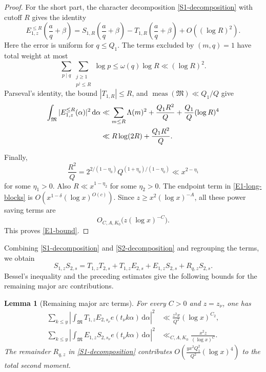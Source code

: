 \documentclass[12pt,reqno]{amsart}
\numberwithin{equation}{section}
\theoremstyle{plain}
\newtheorem{lemma}[theorem]{Lemma}
\theoremstyle{remark}
\newcommand{\dif}{\mathrm{d}}
\newcommand{\majorarc}{\mathfrak{M}}
\begin{document}
\begin{proof}
For the short part, the character decomposition
\eqref{S1-decomposition} with cutoff $R$ gives the identity
\begin{equation*}\label{E1-short-identity}
 E_{1,z}^{\leq R}\left(\frac aq+\beta\right)
 =S_{1,R}\left(\frac aq+\beta\right)
 -T_{1,R}\left(\frac aq+\beta\right)
  +O((\log R)^2).
\end{equation*}
Here the error is uniform for $q\leq Q_1$.
The terms excluded by $(m,q)=1$ have total weight at most
\[
 \sum_{p\mid q}\sum_{\substack{j\geq1\\p^j\leq R}}\log p
 \leq\omega(q)\log R\ll(\log R)^2.
\]
Parseval's identity, the bound $|T_{1,R}|\leq R$, and
$\operatorname{meas}(\majorarc)\ll Q_1/Q$ give
\begin{align*}
 \int_{\majorarc}|E_{1,z}^{\leq R}(\alpha)|^2\,\dif\alpha
 &\ll \sum_{m\leq R}\Lambda(m)^2
      +\frac{Q_1R^2}{Q}
      +\frac{Q_1}{Q}(\log R)^4\notag\\
 &\ll R\log(2R)+\frac{Q_1R^2}{Q}.
 \label{E1-short-blocks}
\end{align*}

Finally,
\[
 \frac{R^2}{Q}
 =2^{2/(1-\eta_0)}Q^{(1+\eta_0)/(1-\eta_0)}
 \ll x^{2-\eta_1}
\]
for some $\eta_1>0$.
Also $R\ll x^{1-\eta_2}$ for some $\eta_2>0$.
The endpoint term in \eqref{E1-long-blocks} is
$O(x^{1-\delta}(\log x)^{O(c)})$.
Since $z\geq x^2(\log x)^{-A}$, all these power saving terms are
\[
 O_{C,A,K_0}\bigl(z(\log x)^{-C}\bigr).
\]
This proves \eqref{E1-bound}.
\end{proof}

Combining \eqref{S1-decomposition} and \eqref{S2-decomposition}
and regrouping the terms, we obtain
\begin{equation}\label{recombined-major-decomposition}
 S_{1,z}S_{2,s}
 =T_{1,z}T_{2,s}+T_{1,z}E_{2,s}+E_{1,z}S_{2,s}
 +R_{q,z}S_{2,s}.
\end{equation}
Bessel's inequality and the preceding estimates give the following
bounds for the remaining major arc contributions.


\begin{lemma}[Remaining major arc terms]\label{lem:mixed-major}
For every $C>0$ and $z=z_\nu$, one has
\begin{align}
 \sum_{k\leq y}
 \left|
 \int_{\majorarc}T_{1,z}E_{2,s_\nu}
 e(t_\nu k\alpha)\,\dif\alpha
 \right|^2
 &\ll
 \frac{z^2x}{Q^2}(\log x)^{C_2},
\label{T1E2-bound}\\
 \sum_{k\leq y}
 \left|
 \int_{\majorarc}E_{1,z}S_{2,s_\nu}
 e(t_\nu k\alpha)\,\dif\alpha
 \right|^2
 &\ll_{C,A,K_0}
 \frac{x^2z}{(\log x)^C}.                     \label{E1S2-bound}
\end{align}
The remainder $R_{q,z}$ in \eqref{S1-decomposition} contributes $O(\frac{yx^2Q_1^2}{Q^2}(\log x)^4)$
to the total second moment.
\end{lemma}
\end{document}
